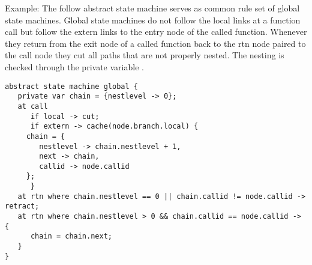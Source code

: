 \noindent
Example: The follow abstract state machine serves as common rule set
of global state machines. Global state machines do not follow
the local links at a function call but follow the extern links to
the entry node of the called function. Whenever they return from
the exit node of a called function back to the rtn node paired
to the call node they cut all paths that are not properly nested.
The nesting is checked through the private variable .

\label{smglobal}
\begin{lstlisting}
abstract state machine global {
   private var chain = {nestlevel -> 0};
   at call
      if local -> cut;
      if extern -> cache(node.branch.local) {
	 chain = {
	    nestlevel -> chain.nestlevel + 1,
	    next -> chain,
	    callid -> node.callid
	 };
      }
   at rtn where chain.nestlevel == 0 || chain.callid != node.callid -> retract;
   at rtn where chain.nestlevel > 0 && chain.callid == node.callid -> {
      chain = chain.next;
   }
}
\end{lstlisting}

\endinput
